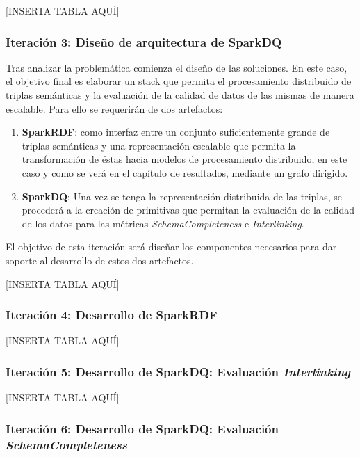 [INSERTA TABLA AQUÍ]

\subsubsection{Iteración 3: Diseño de arquitectura de SparkDQ}

Tras analizar la problemática comienza el diseño de las soluciones. En este
caso, el objetivo final es elaborar un stack que permita el procesamiento
distribuido de triplas semánticas y la evaluación de la calidad de datos de las
mismas de manera escalable. Para ello se requerirán de dos artefactos:

\begin{enumerate}
\item \textbf{SparkRDF}: como interfaz entre un conjunto suficientemente grande de
  triplas semánticas y una representación escalable que permita la
  transformación de éstas hacia modelos de procesamiento distribuido, en este
  caso y como se verá en el capítulo de resultados, mediante un grafo dirigido.
\item \textbf{SparkDQ}: Una vez se tenga la representación distribuida de las triplas, se
  procederá a la creación de primitivas que permitan la evaluación de la calidad
  de los datos para las métricas \textit{SchemaCompleteness} e \textit{Interlinking}.
\end{enumerate}


El objetivo de esta iteración será diseñar los componentes necesarios para dar
soporte al desarrollo de estos dos artefactos.

[INSERTA TABLA AQUÍ]


\subsubsection{Iteración 4: Desarrollo de SparkRDF}


[INSERTA TABLA AQUÍ]

\subsubsection{Iteración 5: Desarrollo de SparkDQ: Evaluación
  \textit{Interlinking}}


[INSERTA TABLA AQUÍ]


\subsubsection{Iteración 6: Desarrollo de SparkDQ: Evaluación
  \textit{SchemaCompleteness}}

